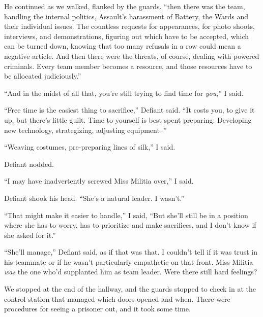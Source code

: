 He continued as we walked, flanked by the guards.  ``\ldotsAnd then there was the team, handling the internal politics, Assault's harassment of Battery, the Wards and their individual issues.  The countless requests for appearances, for photo shoots, interviews, and demonstrations, figuring out which have to be accepted, which can be turned down, knowing that too many refusals in a row could mean a negative article.  And then there were the threats, of course, dealing with powered criminals.  Every team member becomes a resource, and those resources have to be allocated judiciously.''



``And in the midst of all that, you're still trying to find time for \emph{you},'' I said.



``Free time is the easiest thing to sacrifice,'' Defiant said.  ``It costs you, to give it up, but there's little guilt.  Time to yourself is best spent preparing.  Developing new technology, strategizing, adjusting equipment--''



``Weaving costumes, pre-preparing lines of silk,'' I said.



Defiant nodded.



``I may have inadvertently screwed Miss Militia over,'' I said.



Defiant shook his head.  ``She's a natural leader.  I wasn't.''



``That might make it easier to handle,'' I said, ``But she'll still be in a position where she has to worry, has to prioritize and make sacrifices, and I don't know if she asked for it.''



``She'll manage,'' Defiant said, as if that was that.  I couldn't tell if it was trust in his teammate or if he wasn't particularly empathetic on that front.  Miss Militia \emph{was} the one who'd supplanted him as team leader.  Were there still hard feelings?



We stopped at the end of the hallway, and the guards stopped to check in at the control station that managed which doors opened and when.  There were procedures for seeing a prisoner out, and it took some time.



